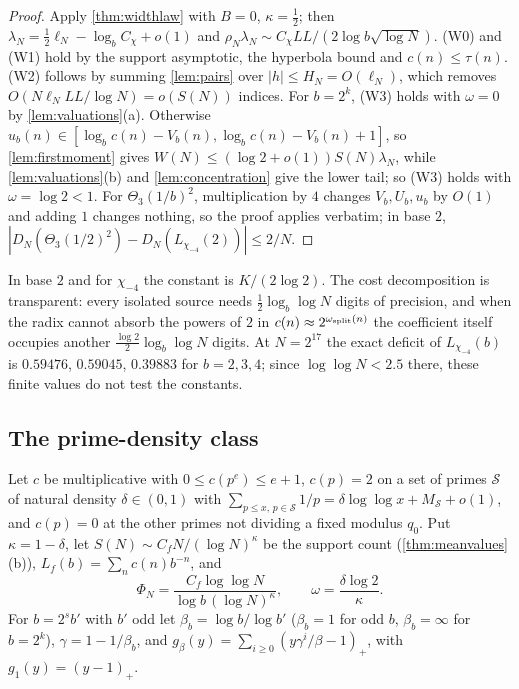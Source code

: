 \documentclass[11pt]{article}
\begin{document}
\begin{proof}
Apply \cref{thm:widthlaw} with $B=0$, $\kappa=\frac12$; then
$\lambda_N=\frac12\ell_N-\log_bC_\chi+o(1)$ and
$\rho_N\lambda_N\sim C_\chi LL/(2\log b\sqrt{\log N})$. (W0) and (W1) hold by the support
asymptotic, the hyperbola bound and $c(n)\le\tau(n)$. (W2) follows by summing
\cref{lem:pairs} over $|h|\le H_N=O(\ell_N)$, which removes $O(N\ell_NLL/\log N)=o(S(N))$
indices. For $b=2^k$, (W3) holds with $\omega=0$ by \cref{lem:valuations}(a). Otherwise
$u_b(n)\in[\log_bc(n)-V_b(n),\log_bc(n)-V_b(n)+1]$, so \cref{lem:firstmoment} gives
$W(N)\le(\log2+o(1))S(N)\lambda_N$, while \cref{lem:valuations}(b) and \cref{lem:concentration}
give the lower tail; so (W3) holds with $\omega=\log2<1$. For $\Theta_3(1/b)^2$, multiplication
by $4$ changes $V_b,U_b,u_b$ by $O(1)$ and adding $1$ changes nothing, so the proof applies
verbatim; in base $2$, $|D_N(\Theta_3(1/2)^2)-D_N(L_{\chi_{-4}}(2))|\le2/N$.
\end{proof}

In base $2$ and for $\chi_{-4}$ the constant is $K/(2\log2)$. The cost decomposition is
transparent: every isolated source needs $\frac12\log_b\log N$ digits of precision, and when the
radix cannot absorb the powers of $2$ in $c(n)\approx2^{\omega_{\rm split}(n)}$ the coefficient
itself occupies another $\frac{\log2}2\log_b\log N$ digits. At $N=2^{17}$ the exact deficit of
$L_{\chi_{-4}}(b)$ is $0.59476$, $0.59045$, $0.39883$ for $b=2,3,4$; since $\log\log N<2.5$
there, these finite values do not test the constants.

\subsection{The prime-density class}\label{subsec:primedensity}

Let $c$ be multiplicative with $0\le c(p^e)\le e+1$, $c(p)=2$ on a set of primes $\mathcal S$
of natural density $\delta\in(0,1)$ with
$\sum_{p\le x,\,p\in\mathcal S}1/p=\delta\log\log x+M_{\mathcal S}+o(1)$, and $c(p)=0$ at the
other primes not dividing a fixed modulus $q_0$. Put $\kappa=1-\delta$, let
$S(N)\sim C_fN/(\log N)^\kappa$ be the support count (\cref{thm:meanvalues}(b)),
$L_f(b)=\sum_nc(n)b^{-n}$, and
\begin{equation}\label{eq:PhiN}
\Phi_N=\frac{C_f\log\log N}{\log b\,(\log N)^\kappa},\qquad \omega=\frac{\delta\log2}\kappa .
\end{equation}
For $b=2^sb'$ with $b'$ odd let $\beta_b=\log b/\log b'$ ($\beta_b=1$ for odd $b$,
$\beta_b=\infty$ for $b=2^k$), $\gamma=1-1/\beta_b$, and
$g_\beta(y)=\sum_{i\ge0}(y\gamma^i/\beta-1)_+$, with $g_1(y)=(y-1)_+$.
\end{document}
